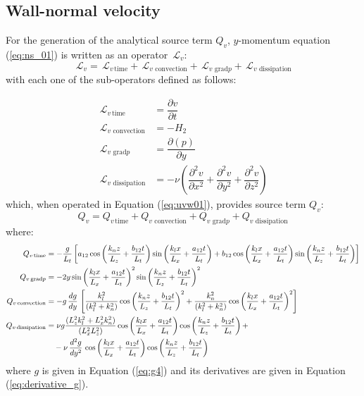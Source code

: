 \documentclass[10pt]{article}
\newcommand{\Diff}[2] {\dfrac{\partial( #1)}{\partial #2}}
\newcommand{\diff}[2] {\dfrac{\partial #1}{\partial #2}}
\newcommand{\Lo}{\,\mathcal{L}}
\newcommand{\convection}{\,\text{convection}}
\newcommand{\gradp}{\,\text{grad}p}
\newcommand{\dissipation}{\,\text{dissipation}}
\begin{document}
\subsection{Wall-normal velocity}
For the generation of the analytical source term $Q_v$, $y$-momentum equation (\ref{eq:ns_01}) is written as an operator $\Lo_v$:
 $$\Lo_v = \Lo_{v \, \text{time}}+\Lo_{v \, \convection}+\Lo_{v \, \gradp }+\Lo_{v \, \dissipation }$$
with each one of the sub-operators defined as follows:

\begin{equation}
 \begin{split}
\Lo_{v \, \text{time}}&= \diff{v}{t}  \\
\Lo_{v \, \convection}&= -H_2\\
\Lo_{v \, \gradp }&= \Diff{p}{y}\\
\Lo_{v \, \dissipation }&= - \nu\left(\diff{^2 v}{ x^2}+\diff{^2 v}{ y^2}+\diff{^2 v}{ z^2} \right)
 \end{split}
\end{equation}
%
which, when operated in Equation (\ref{eq:uvw01}),   provides source term $Q_{v}$:
\begin{equation*} 
Q_v = Q_{v \, \text{time}}+Q_{v \, \convection}+Q_{v \, \gradp }+Q_{v \, \dissipation }
\end{equation*}
where:
\begin{equation*}
\begin{split}
Q_{v \,\text{time}} &=-\dfrac{ g}{L_t}\left[a_{12} \cos\left(\dfrac{k_n z}{L_z}+\dfrac{b_{12} t}{L_t} \right) \sin\left(\dfrac{k_l x}{L_x}+\dfrac{a_{12} t}{L_t} \right)+b_{12} \cos\left(\dfrac{k_l x}{L_x}+\dfrac{a_{12} t}{L_t} \right) \sin\left(\dfrac{k_n z}{L_z}+\dfrac{b_{12} t}{L_t} \right)\right] \vspace{8pt}\\ 
%
Q_{v \gradp} &= -2 y \sin\left(\dfrac{k_l x}{L_x}+\dfrac{a_{12} t}{L_t} \right)^2 \sin\left(\dfrac{k_n z}{L_z}+\dfrac{b_{12} t}{L_t} \right)^2\vspace{8pt}\\
%
Q_{v \convection} &=-g \,\dfrac{dg}{dy}\,\left[\dfrac{k_l^2}{(k_l^2+k_n^2)} \cos\left(\dfrac{k_n z}{L_z}+\dfrac{b_{12} t}{L_t} \right)^2+\dfrac{k_n^2}{(k_l^2+k_n^2)} \cos\left(\dfrac{k_l x}{L_x}+\dfrac{a_{12} t}{L_t} \right)^2 \right] \vspace{8pt}\\ 
%
 Q_{v \dissipation} &=  \nu g\dfrac{(L_z^2 k_l^2+L_x^2 k_n^2)}{(L_x^2 L_z^2)} \cos\left(\dfrac{k_l x}{L_x}+\dfrac{a_{12} t}{L_t} \right) \cos\left(\dfrac{k_n z}{L_z}+\dfrac{b_{12} t}{L_t} \right)+\\
	&\quad-\nu \,\dfrac{d^2g}{dy^2}\, \cos\left(\dfrac{k_l x}{L_x}+\dfrac{a_{12} t}{L_t} \right) \cos\left(\dfrac{k_n z}{L_z}+\dfrac{b_{12} t}{L_t} \right)
\end{split}
\end{equation*}
where $g$ is given in Equation (\ref{eq:g4}) and its derivatives are given in Equation (\ref{eq:derivative_g}).
\end{document}
